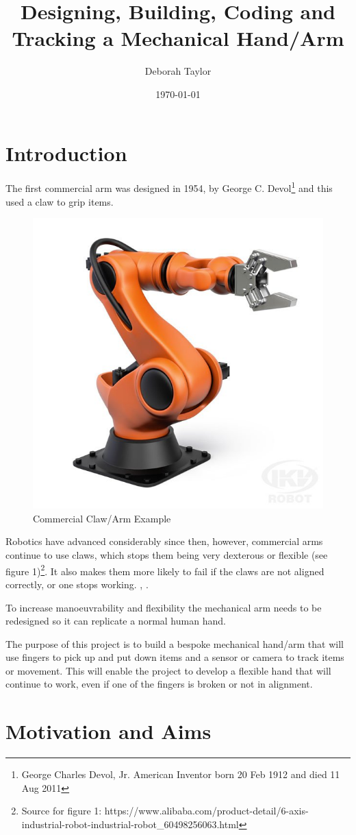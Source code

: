 \documentclass[progress]{cmpreport}
\title{Designing, Building, Coding and Tracking a Mechanical Hand/Arm}
\author{Deborah Taylor}
\date{\today}
\begin{document}
\section{Introduction}
The first commercial arm was designed in 1954, by George C. Devol\footnote{George Charles Devol, Jr. American Inventor born 20 Feb 1912 and died 11 Aug 2011} and this used a claw to grip items.

\begin{figure}
	\caption{Commercial Claw/Arm Example} 
	\includegraphics[width=0.7\linewidth]{photos/claw.jpg}  
\end{figure}
Robotics have advanced considerably since then, however, commercial arms continue to use claws, which stops them being very dexterous or flexible (see figure 1)\footnote{Source for figure 1: https://www.alibaba.com/product-detail/6-axis-industrial-robot-industrial-robot_60498256063.html}. It also makes them more likely to fail if the claws are not aligned correctly, or one stops working. \citep{devol}, \citep{grigorediscovering}.  

To increase manoeuvrability and flexibility the mechanical arm needs to be redesigned so it can replicate a normal human hand. 

The purpose of this project is to build a bespoke mechanical hand/arm that will use fingers to pick up and put down items and a sensor or camera to track items or movement. This will enable the project to develop a flexible hand that will continue to work, even if one of the fingers is broken or not in alignment. 


\section{Motivation and Aims}
\end{document}
